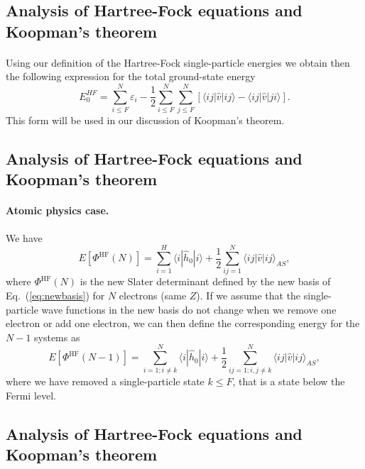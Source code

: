 \documentclass[%
twoside,                 %
final,                   %
10pt]{article}
\begin{document}
\subsection*{Analysis of Hartree-Fock equations and Koopman's theorem}

\paragraph{}
Using our definition of the Hartree-Fock single-particle energies we obtain then the following expression for the total ground-state energy
\[
  E_0^{HF}
  = \sum_{i\le F}^N \varepsilon_i - \frac{1}{2}\sum_{i\le F}^N\sum_{j \le F}^N\left[\langle ij |\hat{v}|ij \rangle-\langle ij|\hat{v}|ji\rangle\right].
\]
This form will be used in our discussion of Koopman's theorem.



\subsection*{Analysis of Hartree-Fock equations and Koopman's theorem}

\paragraph{Atomic physics case.}
We have 
\[
  E[\Phi^{\mathrm{HF}}(N)] 
  = \sum_{i=1}^H \langle i | \hat{h}_0 | i \rangle +
  \frac{1}{2}\sum_{ij=1}^N\langle ij|\hat{v}|ij\rangle_{AS},
\]
where $\Phi^{\mathrm{HF}}(N)$ is the new Slater determinant defined by the new basis of Eq.~(\ref{eq:newbasis})
for $N$ electrons (same $Z$).  If we assume that the single-particle wave functions in the new basis do not change 
when we remove one electron or add one electron, we can then define the corresponding energy for the $N-1$ systems as 
\[
  E[\Phi^{\mathrm{HF}}(N-1)] 
  = \sum_{i=1; i\ne k}^N \langle i | \hat{h}_0 | i \rangle +
  \frac{1}{2}\sum_{ij=1;i,j\ne k}^N\langle ij|\hat{v}|ij\rangle_{AS},
\]
where we have removed a single-particle state $k\le F$, that is a state below the Fermi level.



\subsection*{Analysis of Hartree-Fock equations and Koopman's theorem}
\end{document}
